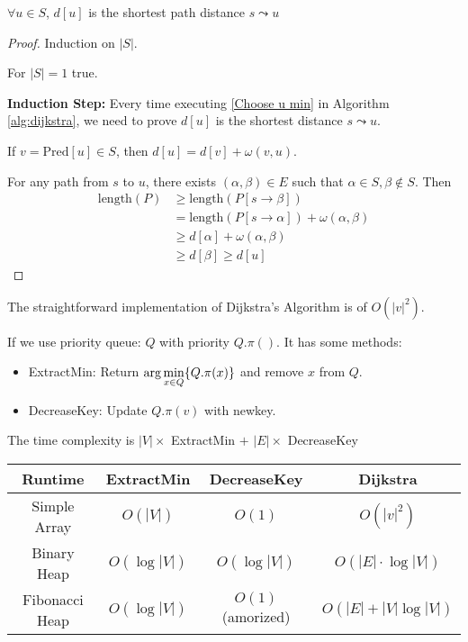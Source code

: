 \begin{theorem}[Invariant]
    $ \forall u\in S $, $ d[u] $ is the shortest path distance  $ s\leadsto u $   
\end{theorem}
\begin{proof}
    Induction on  $ |S| $.
    
    For  $ |S|=1 $ true.

    \textbf{Induction Step: } Every time executing \ref{Choose u min} in Algorithm \ref{alg:dijkstra}, we need to prove  $ d[u] $ is the shortest distance  $ s\leadsto u $.

    If  $ v=\mathrm{Pred}[u]\in S $, then  $ d[u]=d[v]+\omega(v,u) $.
    
    For any path from  $ s $  to  $ u $, there exists  $ (\alpha,\beta)\in E $ such that  $ \alpha\in S,\beta\not\in S $. Then 
    \begin{align*}
        \mathrm{length}(P)& \geq \mathrm{length}(P[s\rightarrow\beta])\\
        & =\mathrm{length}(P[s\rightarrow\alpha])+\omega(\alpha,\beta)\\
        & \geq d[\alpha]+\omega(\alpha,\beta)\\
        & \geq d[\beta] \geq d[u]
    \end{align*}   
\end{proof}

\begin{remark}
    The straightforward implementation of Dijkstra's Algorithm is of  $ O(|v|^2) $.
    
    If we use priority queue: $ Q $ with priority  $ Q.\pi() $. It has some methods:
    \begin{itemize}
        \item ExtractMin: Return  $ \displaystyle\arg\min_{x\in Q}\{Q.\pi(x)\} $ and remove  $ x  $ from  $ Q $.
        \item DecreaseKey: Update  $ Q.\pi(v) $ with newkey. 
    \end{itemize}  
    The time complexity is  $ |V|\times $ ExtractMin  $ + $ $ |E|\times  $  DecreaseKey    
    \begin{center}
        \begin{tabular}{|c|c|c|c|}
            \hline
            Runtime & ExtractMin & DecreaseKey & Dijkstra\\ \hline
            Simple Array   &  $ O(|V|) $   &  $ O(1) $ & $ O(|v|^2) $    \\ \hline
            Binary Heap   &  $ O(\log|V|) $    &  $ O(\log |V|) $ & $ O(|E|\cdot \log|V|) $   \\ \hline
            Fibonacci Heap & $ O(\log|V|) $ &  $ O(1) $ (amorized)&   $ O(|E|+|V|\log|V|) $ \\ \hline
        \end{tabular}
    \end{center}
\end{remark}
